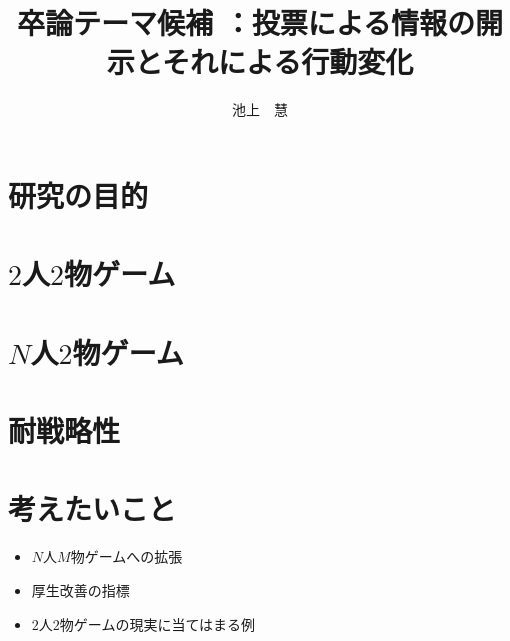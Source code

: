 \documentclass{jsarticle}
\begin{document}
\title{卒論テーマ候補 ：投票による情報の開示とそれによる行動変化}
\author{池上　慧}
\maketitle

\section{研究の目的}

\section{$2$人$2$物ゲーム}

\section{$N$人$2$物ゲーム}

\section{耐戦略性}

\section{考えたいこと}
\begin{itemize}
	\item $N$人$M$物ゲームへの拡張
	\item 厚生改善の指標
	\item $2$人$2$物ゲームの現実に当てはまる例
\end{itemize}
\end{document}
